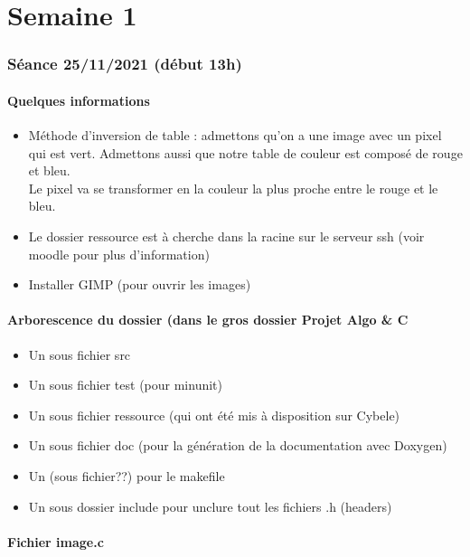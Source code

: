 \documentclass[10pt,a4paper]{article}
\begin{document}
\tableofcontents
\newpage
\part{Semaine 1}
\section{Séance 25/11/2021 (début 13h)}
\subsection{Quelques informations}
\begin{itemize}

\item Méthode d'inversion de table : admettons qu'on a une image avec un pixel qui est vert. Admettons aussi que notre table de couleur est composé de rouge et bleu. \\
Le pixel va se transformer en la couleur la plus proche entre le rouge et le bleu. \\

\item Le dossier ressource est à cherche dans la racine sur le serveur ssh (voir moodle pour plus d'information)\\
\item Installer GIMP (pour ouvrir les images)
\end{itemize}
\subsection{Arborescence du dossier (dans le gros dossier Projet Algo \& C}
\begin{itemize}
\item Un sous fichier src
\item Un sous fichier test (pour minunit)
\item Un sous fichier ressource (qui ont été mis à disposition sur Cybele)
\item Un sous fichier doc (pour la génération de la documentation avec Doxygen)
\item Un (sous fichier??) pour le makefile
\item Un sous dossier include pour unclure tout les fichiers .h (headers)
\end{itemize}

\subsection{Fichier image.c}
\end{document}
